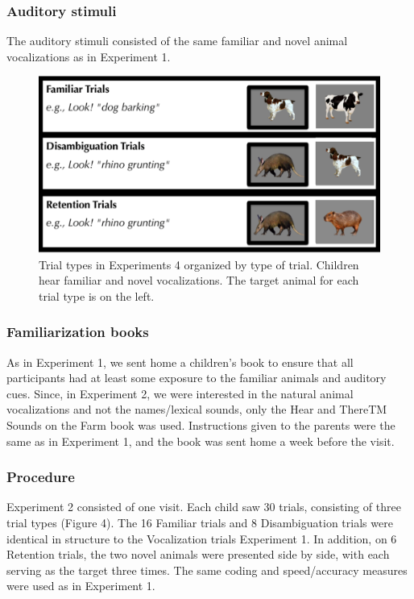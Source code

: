 \documentclass[english,floatsintext,man]{apa6}
\theoremstyle{definition}
\theoremstyle{definition}
\theoremstyle{definition}
\theoremstyle{remark}
\begin{document}
\subsubsection{Auditory stimuli}\label{auditory-stimuli-1}

The auditory stimuli consisted of the same familiar and novel animal
vocalizations as in Experiment 1.

\begin{figure}
\centering
\includegraphics{anime_manuscript_files/figure-latex/stimuli-e2-1.pdf}
\caption{\label{fig:stimuli-e2}Trial types in Experiments 4 organized by
type of trial. Children hear familiar and novel vocalizations. The
target animal for each trial type is on the left.}
\end{figure}

\subsubsection{Familiarization books}\label{familiarization-books-1}

As in Experiment 1, we sent home a children's book to ensure that all
participants had at least some exposure to the familiar animals and
auditory cues. Since, in Experiment 2, we were interested in the natural
animal vocalizations and not the names/lexical sounds, only the Hear and
ThereTM Sounds on the Farm book was used. Instructions given to the
parents were the same as in Experiment 1, and the book was sent home a
week before the visit.

\subsubsection{Procedure}\label{procedure-1}

Experiment 2 consisted of one visit. Each child saw 30 trials,
consisting of three trial types (Figure 4). The 16 Familiar trials and 8
Disambiguation trials were identical in structure to the Vocalization
trials Experiment 1. In addition, on 6 Retention trials, the two novel
animals were presented side by side, with each serving as the target
three times. The same coding and speed/accuracy measures were used as in
Experiment 1.
\end{document}
